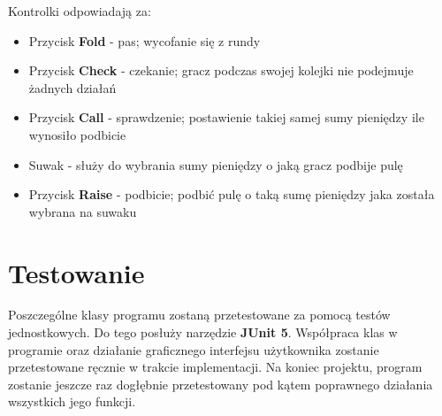 \documentclass{article}
\begin{document}
            Kontrolki odpowiadają za:
            \begin{itemize}
                \item Przycisk \textbf{Fold} - pas; wycofanie się z rundy
                \item Przycisk \textbf{Check} - czekanie; gracz podczas swojej kolejki nie podejmuje żadnych działań
                \item Przycisk \textbf{Call} - sprawdzenie; postawienie takiej samej sumy pieniędzy ile wynosiło podbicie
                \item Suwak - służy do wybrania sumy pieniędzy o jaką gracz podbije pulę
                \item Przycisk \textbf{Raise} - podbicie; podbić pulę o taką sumę pieniędzy jaka została wybrana na suwaku
            \end{itemize}


\section{Testowanie}
    Poszczególne klasy programu zostaną przetestowane za pomocą testów jednostkowych. 
    Do tego posłuży narzędzie \textbf{JUnit 5}.
    Współpraca klas w programie oraz działanie graficznego interfejsu użytkownika zostanie przetestowane ręcznie w trakcie implementacji.
    Na koniec projektu, program zostanie jeszcze raz dogłębnie przetestowany pod kątem poprawnego działania wszystkich jego funkcji.
\end{document}
